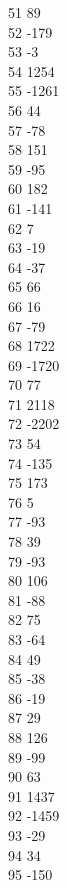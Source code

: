 { 51	89 \\
 52	-179 \\
 53	-3 \\
 54	1254 \\
 55	-1261 \\
 56	44 \\
 57	-78 \\
 58	151 \\
 59	-95 \\
 60	182 \\
 61	-141 \\
 62	7 \\
 63	-19 \\
 64	-37 \\
 65	66 \\
 66	16 \\
 67	-79 \\
 68	1722 \\
 69	-1720 \\
 70	77 \\
 71	2118 \\
 72	-2202 \\
 73	54 \\
 74	-135 \\
 75	173 \\
 76	5 \\
 77	-93 \\
 78	39 \\
 79	-93 \\
 80	106 \\
 81	-88 \\
 82	75 \\
 83	-64 \\
 84	49 \\
 85	-38 \\
 86	-19 \\
 87	29 \\
 88	126 \\
 89	-99 \\
 90	63 \\
 91	1437 \\
 92	-1459 \\
 93	-29 \\
 94	34 \\
 95	-150 \\
}
